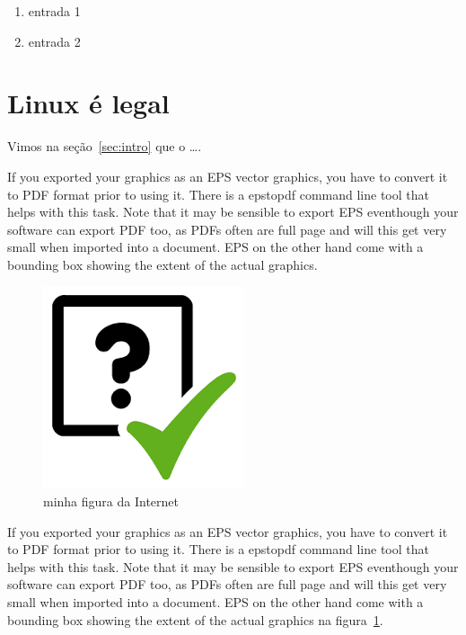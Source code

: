 \documentclass[a4page,12pt]{article}
\begin{document}
\begin{enumerate}
\item entrada 1
\item entrada 2
\end{enumerate}


\section{Linux é legal}

Vimos na seção~\ref{sec:intro} que o \ldots.

If you exported your graphics as an EPS vector graphics, you have to convert it to PDF format prior to using it. There is a epstopdf command line tool that helps with this task. Note that it may be sensible to export EPS eventhough your software can export PDF too, as PDFs often are full page and will this get very small when imported into a document. EPS on the other hand come with a bounding box showing the extent of the actual graphics.

\begin{figure}[h]
  \begin{center}
    \includegraphics[angle=45,width=.5\textwidth]{teste.png}
    \caption{minha figura da Internet}\label{fig:teste}
  \end{center}
\end{figure}

If you exported your graphics as an EPS vector graphics, you have to convert it to PDF format prior to using it. There is a epstopdf command line tool that helps with this task. Note that it may be sensible to export EPS eventhough your software can export PDF too, as PDFs often are full page and will this get very small when imported into a document. EPS on the other hand come with a bounding box showing the extent of the actual graphics na figura~\ref{fig:teste}.
\end{document}
